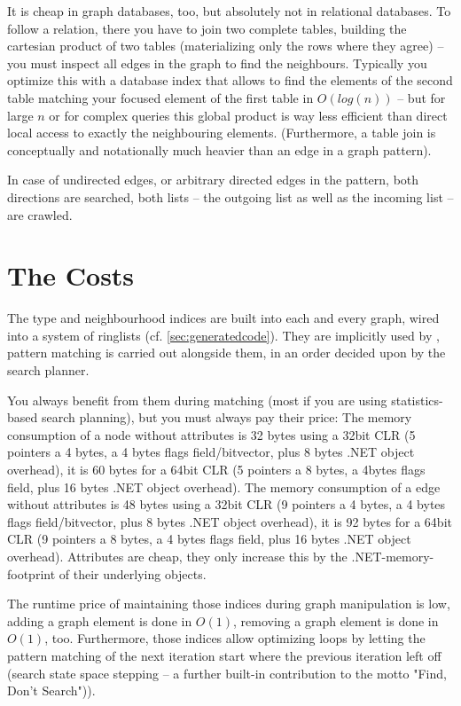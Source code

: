 It is cheap in graph databases, too, but absolutely not in relational databases.
To follow a relation, there you have to join two complete tables, building the cartesian product of two tables (materializing only the rows where they agree) -- you must inspect all edges in the graph to find the neighbours.
Typically you optimize this with a database index that allows to find the elements of the second table matching your focused element of the first table in $O(log(n))$ -- but for large $n$ or for complex queries this global product is way less efficient than direct local access to exactly the neighbouring elements.
(Furthermore, a table join is conceptually and notationally much heavier than an edge in a graph pattern).

In case of undirected edges, or arbitrary directed edges in the pattern, both directions are searched,
both lists -- the outgoing list as well as the incoming list -- are crawled.

\section{The Costs}\label{sec:performancememory} 
The type and neighbourhood indices are built into each and every \GrG{} graph, wired into a system of ringlists (cf. \ref{sec:generatedcode}).
They are implicitly used by \GrG{}, pattern matching is carried out alongside them, in an order decided upon by the search planner. 

You always benefit from them during matching (most if you are using statistics-based search planning), but you must always pay their price:
The memory consumption of a \GrG{} node without attributes is 32 bytes using a 32bit CLR (5 pointers a 4 bytes, a 4 bytes flags field/bitvector, plus 8 bytes .NET object overhead), it is 60 bytes for a 64bit CLR (5 pointers a 8 bytes, a 4bytes flags field, plus 16 bytes .NET object overhead).
The memory consumption of a \GrG{} edge without attributes is 48 bytes using a 32bit CLR (9 pointers a 4 bytes, a 4 bytes flags field/bitvector, plus 8 bytes .NET object overhead), it is 92 bytes for a 64bit CLR (9 pointers a 8 bytes, a 4 bytes flags field, plus 16 bytes .NET object overhead).
Attributes are cheap, they only increase this by the .NET-memory-footprint of their underlying objects.

The runtime price of maintaining those indices during graph manipulation is low, adding a graph element is done in $O(1)$, removing a graph element is done in $O(1)$, too. 
Furthermore, those indices allow optimizing loops by letting the pattern matching of the next iteration start where the previous iteration left off (search state space stepping -- a further built-in contribution to the motto "Find, Don't Search")).

